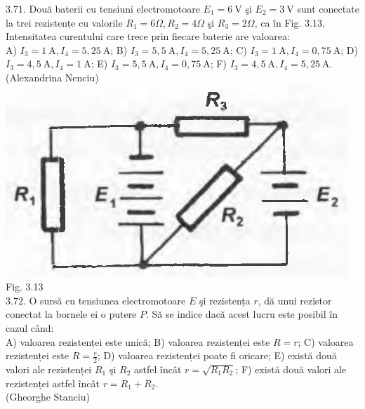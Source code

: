 \documentclass[10pt]{article}
\begin{document}
3.71. Două baterii cu tensiuni electromotoare $E_{1}=6 \mathrm{~V}$ şi $E_{2}=3 \mathrm{~V}$ sunt conectate la trei rezistențe cu valorile $R_{1}=6 \Omega, R_{2}=4 \Omega$ şi $R_{3}=2 \Omega$, ca în Fig. 3.13. Intensitatea curentului care trece prin fiecare baterie are valoarea:\\ A) $I_{3}=1 \mathrm{~A}, I_{4}=5,25 \mathrm{~A}$; B) $I_{3}=5,5 \mathrm{~A}, I_{4}=5,25 \mathrm{~A}$; C) $I_{3}=1 \mathrm{~A}, I_{4}=0,75 \mathrm{~A}$; D) $I_{3}=4,5 \mathrm{~A}, I_{4}=1 \mathrm{~A}$; E) $I_{3}=5,5 \mathrm{~A}, I_{4}=0,75 \mathrm{~A}$; F) $I_{3}=4,5 \mathrm{~A}, I_{4}=5,25 \mathrm{~A}$.\\ (Alexandrina Nenciu)\\ \includegraphics[max width=\textwidth, center]{2025_07_01_5b3ff9fa0d508c8e9f17g-159(2)} Fig. 3.13\\

3.72. O sursă cu tensiunea electromotoare $E$ şi rezistența $r$, dă unui rezistor conectat la bornele ei o putere $P$. Să se indice dacă acest lucru este posibil în cazul când:\\ A) valoarea rezistenței este unică; B) valoarea rezistenței este $R=r$; C) valoarea rezistenței este $R=\frac{r}{2}$; D) valoarea rezistenței poate fi oricare; E) există două valori ale rezistenței $R_{1}$ şi $R_{2}$ astfel încât $r=\sqrt{R_{1} R_{2}}$; F) există două valori ale rezistenței astfel încât $r=R_{1}+R_{2}$.\\ (Gheorghe Stanciu)\\
\end{document}
